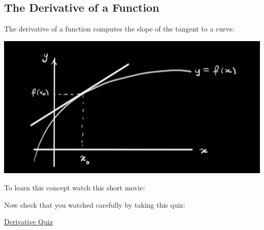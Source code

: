 \subsection*{The Derivative of a Function}

\thispagestyle{empty}

The derivative of a function computes the slope of the tangent to a curve:

\begin{center}
\includegraphics[scale=.4]{slope.jpg}
\end{center}

\noindent
To learn this concept watch this short movie:


\noindent
Now check that you watched carefully by taking this quiz:

\begin{center}
\href{\webworkurl Demo}{\hspace{2mm} Derivative Quiz}\hspace{8mm}
\end{center}


